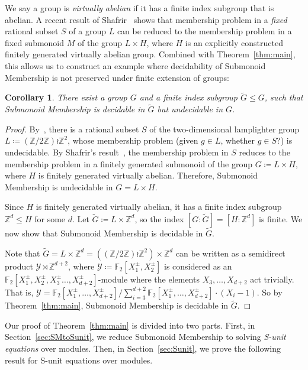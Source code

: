 \documentclass[a4paper,UKenglish,cleveref, autoref, thm-restate]{lipics-v2021}
\newcommand{\Z}{\mathbb{Z}}
\newcommand{\F}{\mathbb{F}}
\newcommand{\mY}{\mathcal{Y}}
\newtheorem{cor}[thrm]{Corollary}
\theoremstyle{definition}
\theoremstyle{definition}
\theoremstyle{definition}
\begin{document}
We say a group is \emph{virtually abelian} if it has a finite index subgroup that is abelian.
A recent result of Shafrir~\cite[Theorem~8.1]{shafrir2024decidability} shows that membership problem in a \emph{fixed} rational subset $S$ of a group $L$ can be reduced to the membership problem in a fixed submonoid $M$ of the group $L \times H$, where $H$ is an explicitly constructed finitely generated virtually abelian group.
Combined with Theorem~\ref{thm:main}, this allows us to construct an example where decidability of Submonoid Membership is not preserved under finite extension of groups:
\begin{cor}\label{cor:finext}
    There exist a group $G$ and a finite index subgroup $\widetilde{G} \leq G$, such that Submonoid Membership is decidable in $\widetilde{G}$ but undecidable in $G$.
\end{cor}
\begin{proof}
    By~\cite[Theorem~10]{lohrey2011tilings}, there is a rational subset $S$ of the two-dimensional lamplighter group $L \coloneqq (\Z/2\Z) \wr \Z^2$, whose membership problem (given $g \in L$, whether $g \in S$?) is undecidable.
    By Shafrir's result~\cite[Theorem~8.1]{shafrir2024decidability}, the membership problem in $S$ reduces to the membership problem in a finitely generated submonoid of the group $G \coloneqq L \times H$, where $H$ is finitely generated virtually abelian.
    Therefore, Submonoid Membership is undecidable in $G = L \times H$. 
    
    Since $H$ is finitely generated virtually abelian, it has a finite index subgroup $\Z^d \leq H$ for some $d$.
    Let $\widetilde{G} \coloneqq L \times \Z^d$, so the index $[G \colon \widetilde{G}] = [H \colon \Z^d]$ is finite.
    We now show that Submonoid Membership is decidable in $\widetilde{G}$.
    
    Note that $\widetilde{G} = L \times \Z^d = \left((\Z/2\Z) \wr \Z^2 \right) \times \Z^d$ can be written as a semidirect product $\mY \rtimes \Z^{d+2}$, where $\mY \coloneqq \F_2[X_1^{\pm}, X_2^{\pm}]$ is considered as an $\F_2[X_1^{\pm}, X_2^{\pm}, X_3^{\pm} \ldots, X_{d+2}^{\pm}]$-module where the elements $X_3, \ldots, X_{d+2}$ act trivially. That is, $\mY = \F_2[X_1^{\pm}, \ldots, X_{d+2}^{\pm}]/\sum_{i=3}^{d+2}\F_2[X_1^{\pm}, \ldots, X_{d+2}^{\pm}] \cdot (X_i - 1)$. So by Theorem~\ref{thm:main}, Submonoid Membership is decidable in $\widetilde{G}$.
\end{proof}

Our proof of Theorem~\ref{thm:main} is divided into two parts.
First, in Section~\ref{sec:SMtoSunit}, we reduce Submonoid Membership to solving \emph{S-unit equations} over modules. 
Then, in Section~\ref{sec:Sunit}, we prove the following result for S-unit equations over modules.
\end{document}
